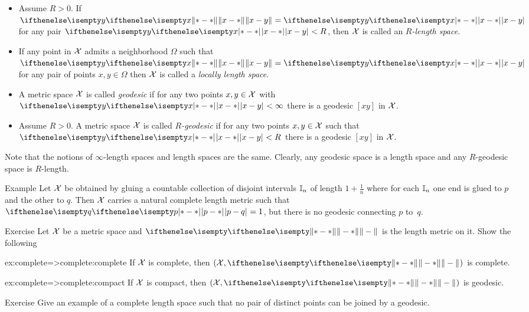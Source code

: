 \begin{itemize}
\item Assume $R>0$.
If $\yetdist{x}{y}{}=\dist{x}{y}{}$ for any pair $\dist{x}{y}{}<R$, then $\mathcal{X}$ is called an \emph{$R$-length space}.
\item If any point in $\mathcal{X}$ admits a neighborhood  $\Omega$ such that $\yetdist{x}{y}{}=\dist{x}{y}{}$ for any pair of points $x,y\in \Omega$
then  $\mathcal{X}$ is called a \emph{locally length space}.
\item A metric space $\mathcal{X}$ is called 
\emph{geodesic}%
if for any two points $x,y\in \spc{X}$ with $\dist{x}{y}{}<\infty$ there is a geodesic $[x y]$ in $\mathcal{X}$.
\item Assume $R>0$. A metric space $\mathcal{X}$ is called 
\emph{$R$-geodesic}%
if for any two points $x,y\in \spc{X}$ such that $\dist{x}{y}{}<R$ there is a geodesic $[x y]$ in $\mathcal{X}$.
\end{itemize}

Note that the notions of $\infty$-length spaces and length spaces are the same.
Clearly, any geodesic space is a length space 
and any $R$-geodesic space is $R$-length.

\begin{thm}{Example} 
Let $\mathcal{X}$ be obtained by gluing a countable collection of disjoint intervals $\mathbb{I}_n$ of length $1+\tfrac1n$ where for each $\mathbb{I}_n$ one end is glued to $p$ and the other to $q$.
Then $\mathcal{X}$ carries a natural complete length metric such that $\dist{p}{q}{}=1$, but there is no geodesic connecting $p$ to~$q$.
\end{thm}

\begin{thm}{Exercise}\label{ex:complete=>complete}
Let $\mathcal{X}$ be a metric space
and $\yetdist{}{}{}$ is the length metric on it.
Show the following
\begin{subthm}{ex:complete=>complete:complete}
If $\mathcal{X}$  is complete, then  $(\spc{X},\yetdist{}{}{})$ is complete.
\end{subthm}

\begin{subthm}{ex:complete=>complete:compact}
If $\mathcal{X}$ is compact, then $(\spc{X},\yetdist{}{}{})$ is geodesic.
\end{subthm}
\end{thm}


\begin{thm}{Exercise}\label{ex:no-geod}
Give an example of a complete length space such that no pair of distinct points can be joined by a geodesic.
\end{thm}

